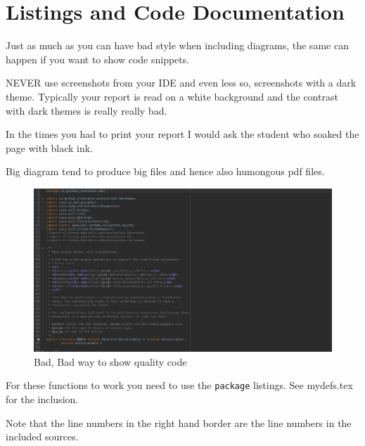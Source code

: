 \def\TheFile{ch05_codelisting.tex}
\chapter{Listings and Code Documentation}

Just as much as you can have bad style when including diagrams, the same can happen if
you want to show code snippets.

\begin{Itemize}
\item {\color{red!60!black}\Huge{}NEVER} use screenshots from your IDE and even less so, screenshots with a dark theme.
  Typically your report is read on a white background and the contrast with dark themes is really really bad.
\item In the times you had to print your report I would ask the student who soaked the page with black ink.
\item Big diagram tend to produce big files and hence also humongous pdf files.
\end{Itemize}

\begin{figure}
  \caption{Bad, Bad way to show quality code}
  \includegraphics[width=\textwidth]{images/dao.png}
\end{figure}

For these functions to work you need to use the \texttt{package} listings.
See mydefs.tex for the inclusion.


Note that the line numbers in the right hand border are the line
numbers in the included sources.


